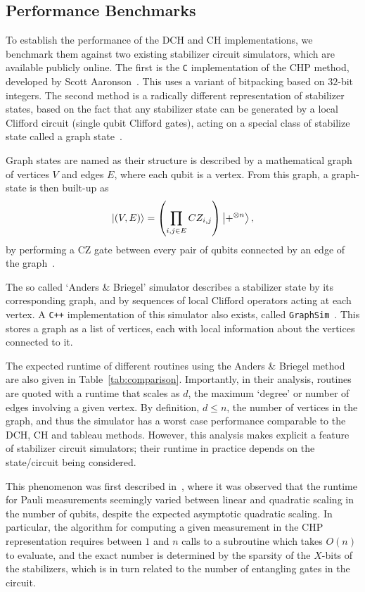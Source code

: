 \subsection{Performance Benchmarks}
To establish the performance of the DCH and CH implementations, we benchmark them against two existing stabilizer circuit simulators, which are available publicly online. The first is the \texttt{C} implementation of the CHP method, developed by Scott Aaronson~\cite{Aaronson2004b}. This uses a variant of bitpacking based on $32$-bit integers. The second method is a radically different representation of stabilizer states, based on the fact that any stabilizer state can be generated by a local Clifford circuit (single qubit Clifford gates), acting on a special class of stabilize state called a graph state~\cite{Schlingemann2001,VandenNest2004}.\par
Graph states are named as their structure is described by a mathematical graph of vertices $V$ and edges $E$, where each qubit is a vertex. From this graph, a graph-state is then built-up as
\[\ket{(V,E)} = \left(\prod_{i,j \in E}CZ_{i,j}\right)\ket{+^{\otimes n}},\]
by performing a CZ gate between every pair of qubits connected by an edge of the graph~\cite{VandenNest2004}.\par
The so called `Anders \& Briegel' simulator describes a stabilizer state by its corresponding graph, and by sequences of local Clifford operators acting at each vertex. A \texttt{C++} implementation of this simulator also exists, called \texttt{GraphSim}~\cite{Anders2006b}. This stores a graph as a list of vertices, each with local information about the vertices connected to it.\par
The expected runtime of different routines using the Anders \& Briegel method are also given in Table~\ref{tab:comparison}. Importantly, in their analysis, routines are quoted with a runtime that scales as $d$, the maximum `degree' or number of edges involving a given vertex. By definition, $d\leq n$, the number of vertices in the graph, and thus the simulator has a worst case performance comparable to the DCH, CH and tableau methods. However, this analysis makes explicit a feature of stabilizer circuit simulators; their runtime in practice depends on the state/circuit being considered.\par
This phenomenon was first described in~\cite{Aaronson2004}, where it was observed that the runtime for Pauli measurements seemingly varied between linear and quadratic scaling in the number of qubits, despite the expected asymptotic quadratic scaling. In particular, the algorithm for computing a given measurement in the CHP representation requires between $1$ and $n$ calls to a subroutine which takes $O(n)$ to evaluate, and the exact number is determined by the sparsity of the $X$-bits of the stabilizers, which is in turn related to the number of entangling gates in the circuit.\par
